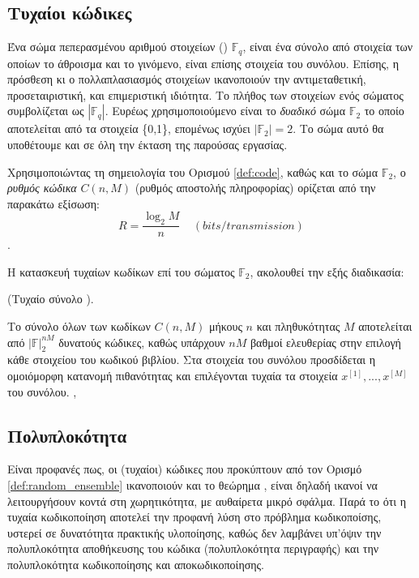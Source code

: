 \subsection{Τυχαίοι κώδικες}
Ένα σώμα πεπερασμένου αριθμού στοιχείων () $\mathbb{F}_q$, είναι ένα σύνολο από στοιχεία των οποίων το άθροισμα και το γινόμενο, είναι επίσης στοιχεία του συνόλου. Επίσης, η πρόσθεση κι ο πολλαπλασιασμός στοιχείων ικανοποιούν την αντιμεταθετική, προσεταιριστική, και επιμεριστική ιδιότητα. Tο πλήθος των στοιχείων ενός σώματος συμβολίζεται ως $|\mathbb{F}_q|$. Ευρέως χρησιμοποιούμενο είναι το \textit{δυαδικό} σώμα $\mathbb{F}_2$ το οποίο αποτελείται από τα στοιχεία \{0,1\}, επομένως ισχύει $|\mathbb{F}_2|=2$. Το σώμα αυτό θα υποθέτουμε και σε όλη την έκταση της παρούσας εργασίας.


Χρησιμοποιώντας τη σημειολογία του Ορισμού \ref{def:code}, καθώς και το σώμα $\mathbb{F}_2$, ο \textit{ρυθμός κώδικα} $C(n,M)$ (ρυθμός αποστολής πληροφορίας) ορίζεται από την παρακάτω εξίσωση:
\begin{equation}
R=\frac{\log_{2}M}{n}\;\;\;\;(bits/transmission)
\label{eq: code rate}
\end{equation}
\cite{cover2012elements}.

Η κατασκευή τυχαίων κωδίκων επί του σώματος $\mathbb{F}_2$, ακολουθεί την εξής διαδικασία:
\begin{definition}{(Τυχαίο σύνολο ).}

Το σύνολο όλων των κωδίκων $C(n,M)$ μήκους $n$ και πληθυκότητας $M$ αποτελείται από $|\mathbb{F}|_2^{nM}$ δυνατούς κώδικες, καθώς υπάρχουν $nM$ βαθμοί ελευθερίας στην επιλογή κάθε στοιχείου του κωδικού βιβλίου. Στα στοιχεία του συνόλου προσδίδεται η ομοιόμορφη κατανομή πιθανότητας και επιλέγονται τυχαία τα στοιχεία $x^{[1]},...,x^{[M]}$ του συνόλου. \cite{richardson2008modern},\cite{shannon1948mathematical}
\label{def:random_ensemble}
\end{definition}

\subsection{Πολυπλοκότητα}
Είναι προφανές πως, οι (τυχαίοι) κώδικες που προκύπτουν από τον Ορισμό \ref{def:random_ensemble} ικανοποιούν και το θεώρημα , είναι δηλαδή ικανοί να λειτουργήσουν κοντά στη χωρητικότητα, με αυθαίρετα μικρό σφάλμα. Παρά το ότι η τυχαία κωδικοποίηση αποτελεί την προφανή λύση στο πρόβλημα κωδικοποίσης, υστερεί σε δυνατότητα πρακτικής υλοποίησης, καθώς δεν λαμβάνει υπ'όψιν την πολυπλοκότητα αποθήκευσης του κώδικα (πολυπλοκότητα περιγραφής) και την πολυπλοκότητα κωδικοποίησης και αποκωδικοποίησης.


